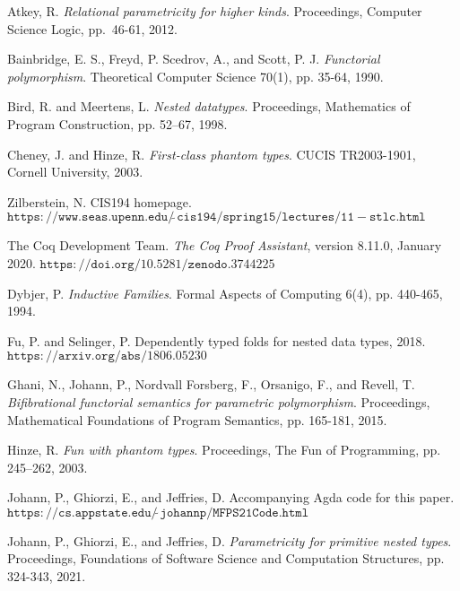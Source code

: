 \documentclass[9pt]{entcs}
\begin{document}
\begin{thebibliography}{10}\label{bibliography}

 Atkey, R.  {\em Relational parametricity for higher
  kinds}.  Proceedings, Computer Science Logic, pp.~46-61, 2012.

 Bainbridge, E. S., Freyd, P. Scedrov, A., and Scott,
  P. J. {\em Functorial polymorphism}. Theoretical Computer Science
  70(1), pp. 35-64, 1990.

 Bird, R. and Meertens, L. {\em Nested
  datatypes}. Proceedings, Mathematics of Program Construction,
  pp. 52–67, 1998.

 Cheney, J. and Hinze, R. {\em First-class phantom
 types}. CUCIS TR2003-1901, Cornell University, 2003.

Zilberstein, N. CIS194 homepage.
$\mathtt{https://www.seas.upenn.edu/\tilde~cis194/spring15/lectures/11\!\!-\!\!stlc.html}$
  

 The Coq Development Team. {\em The Coq Proof
  Assistant}, version 8.11.0, January 2020.
  $\mathtt{https://doi.org/10.5281/zenodo.3744225}$

 Dybjer, P. {\em Inductive Families}. Formal Aspects of
  Computing 6(4), pp. 440-465, 1994.
  
 Fu, P. and Selinger, P.  Dependently typed folds for
  nested data types, 2018. $\mathtt{https://arxiv.org/abs/1806.05230}$ 
  
 Ghani, N., Johann, P., Nordvall Forsberg, F.,
  Orsanigo, F., and Revell, T. {\em Bifibrational functorial semantics
    for parametric polymorphism}. Proceedings, Mathematical
  Foundations of Program Semantics, pp. 165-181, 2015.

 Hinze, R. {\em Fun with phantom types}. Proceedings,
 The Fun of Programming, pp. 245–262, 2003.

 Johann, P., Ghiorzi, E., and Jeffries,
  D. Accompanying Agda code for this paper.
    $\mathtt{https://cs.appstate.edu/\tilde~johannp/MFPS21Code.html}$
 
 Johann, P., Ghiorzi, E., and Jeffries, D. {\em
  Parametricity for primitive nested types}. Proceedings, Foundations
  of Software Science and Computation Structures, pp. 324-343, 2021.


\end{thebibliography}
\end{document}
